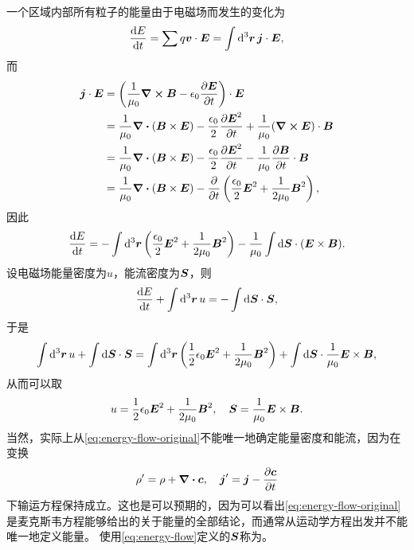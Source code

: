 一个区域内部所有粒子的能量由于电磁场而发生的变化为
\begin{equation}
    \dv{E}{t} = \sum q \vb*{v} \cdot \vb*{E} = \int \dd[3]{\vb*{r}} \vb*{j} \cdot \vb*{E},
\end{equation}
而
\[
    \begin{aligned}
        \vb*{j} \cdot \vb*{E} &= \left( \frac{1}{\mu_0} \curl{\vb*{B}} - \epsilon_0 \pdv{\vb*{E}}{t} \right) \cdot \vb*{E} \\
        &= \frac{1}{\mu_0} \div{(\vb*{B} \times \vb*{E})} - \frac{\epsilon_0}{2} \pdv{\vb*{E}^2}{t} + \frac{1}{\mu_0} (\curl{\vb*{E}}) \cdot \vb*{B} \\
        &= \frac{1}{\mu_0} \div{(\vb*{B} \times \vb*{E})} - \frac{\epsilon_0}{2} \pdv{\vb*{E}^2}{t} - \frac{1}{\mu_0} \pdv{\vb*{B}}{t} \cdot \vb*{B} \\
        &= \frac{1}{\mu_0} \div{(\vb*{B} \times \vb*{E})} - \pdv{t} \left( \frac{\epsilon_0}{2} \vb*{E}^2 + \frac{1}{2 \mu_0} \vb*{B}^2 \right),
    \end{aligned}
\]
因此
\[
    \dv{E}{t} = - \int \dd[3]{\vb*{r}} \left( \frac{\epsilon_0}{2} \vb*{E}^2 + \frac{1}{2 \mu_0} \vb*{B}^2 \right) - \frac{1}{\mu_0} \int \dd{\vb*{S}} \cdot (\vb*{E} \times \vb*{B}).
\]
设电磁场能量密度为$u$，能流密度为$\vb*{S}$，则
\[
    \dv{E}{t} + \int \dd[3]{\vb*{r}} u = - \int \dd{\vb*{S}} \cdot \vb*{S},
\]
于是
\begin{equation}
    \int \dd[3]{\vb*{r}} u + \int \dd{\vb*{S}} \cdot \vb*{S} = \int \dd[3]{\vb*{r}} \left( \frac{1}{2} \epsilon_0 \vb*{E}^2 + \frac{1}{2\mu_0} \vb*{B}^2 \right) + \int \dd{\vb*{S}} \cdot \frac{1}{\mu_0} \vb*{E} \times \vb*{B},
    \label{eq:energy-flow-original}
\end{equation}
从而可以取
\begin{equation}
    u = \frac{1}{2} \epsilon_0 \vb*{E}^2 + \frac{1}{2\mu_0} \vb*{B}^2, \quad \vb*{S} = \frac{1}{\mu_0} \vb*{E} \times \vb*{B}.
    \label{eq:energy-flow}
\end{equation}
当然，实际上从\eqref{eq:energy-flow-original}不能唯一地确定能量密度和能流，因为在变换
\[
    \rho' = \rho + \div{\vb*{c}}, \quad \vb*{j}' = \vb*{j} - \pdv{\vb*{c}}{t}
\]
下输运方程保持成立。这也是可以预期的，因为可以看出\eqref{eq:energy-flow-original}是麦克斯韦方程能够给出的关于能量的全部结论，而通常从运动学方程出发并不能唯一地定义能量。
使用\eqref{eq:energy-flow}定义的$\vb*{S}$称为。

